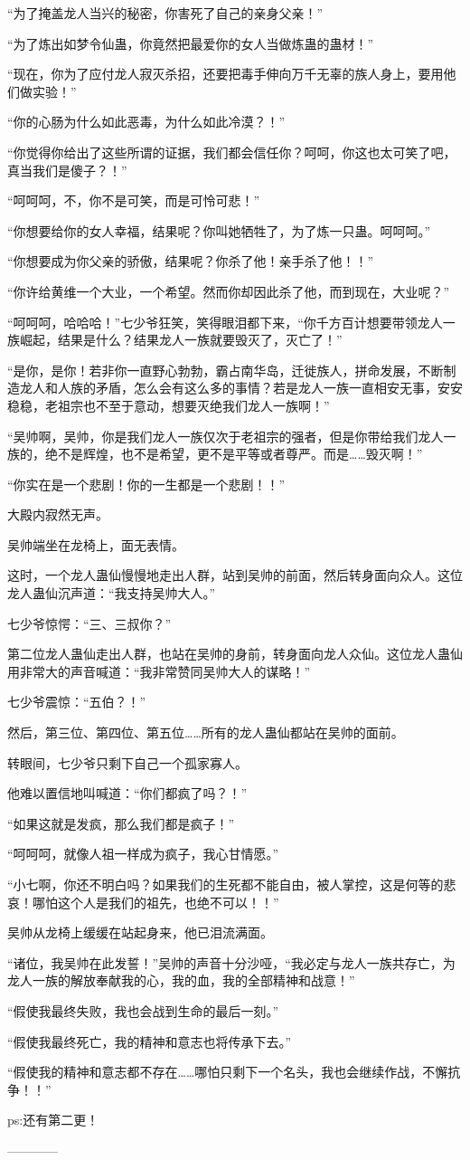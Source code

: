 \begin{this_body}
“为了掩盖龙人当兴的秘密，你害死了自己的亲身父亲！”

“为了炼出如梦令仙蛊，你竟然把最爱你的女人当做炼蛊的蛊材！”

“现在，你为了应付龙人寂灭杀招，还要把毒手伸向万千无辜的族人身上，要用他们做实验！”

“你的心肠为什么如此恶毒，为什么如此冷漠？！”

“你觉得你给出了这些所谓的证据，我们都会信任你？呵呵，你这也太可笑了吧，真当我们是傻子？！”

“呵呵呵，不，你不是可笑，而是可怜可悲！”

“你想要给你的女人幸福，结果呢？你叫她牺牲了，为了炼一只蛊。呵呵呵。”

“你想要成为你父亲的骄傲，结果呢？你杀了他！亲手杀了他！！”

“你许给黄维一个大业，一个希望。然而你却因此杀了他，而到现在，大业呢？”

“呵呵呵，哈哈哈！”七少爷狂笑，笑得眼泪都下来，“你千方百计想要带领龙人一族崛起，结果是什么？结果龙人一族就要毁灭了，灭亡了！”

“是你，是你！若非你一直野心勃勃，霸占南华岛，迁徙族人，拼命发展，不断制造龙人和人族的矛盾，怎么会有这么多的事情？若是龙人一族一直相安无事，安安稳稳，老祖宗也不至于意动，想要灭绝我们龙人一族啊！”

“吴帅啊，吴帅，你是我们龙人一族仅次于老祖宗的强者，但是你带给我们龙人一族的，绝不是辉煌，也不是希望，更不是平等或者尊严。而是……毁灭啊！”

“你实在是一个悲剧！你的一生都是一个悲剧！！”

大殿内寂然无声。

吴帅端坐在龙椅上，面无表情。

这时，一个龙人蛊仙慢慢地走出人群，站到吴帅的前面，然后转身面向众人。这位龙人蛊仙沉声道：“我支持吴帅大人。”

七少爷惊愕：“三、三叔你？”

第二位龙人蛊仙走出人群，也站在吴帅的身前，转身面向龙人众仙。这位龙人蛊仙用非常大的声音喊道：“我非常赞同吴帅大人的谋略！”

七少爷震惊：“五伯？！”

然后，第三位、第四位、第五位……所有的龙人蛊仙都站在吴帅的面前。

转眼间，七少爷只剩下自己一个孤家寡人。

他难以置信地叫喊道：“你们都疯了吗？！”

“如果这就是发疯，那么我们都是疯子！”

“呵呵呵，就像人祖一样成为疯子，我心甘情愿。”

“小七啊，你还不明白吗？如果我们的生死都不能自由，被人掌控，这是何等的悲哀！哪怕这个人是我们的祖先，也绝不可以！！”

吴帅从龙椅上缓缓在站起身来，他已泪流满面。

“诸位，我吴帅在此发誓！”吴帅的声音十分沙哑，“我必定与龙人一族共存亡，为龙人一族的解放奉献我的心，我的血，我的全部精神和战意！”

“假使我最终失败，我也会战到生命的最后一刻。”

“假使我最终死亡，我的精神和意志也将传承下去。”

“假使我的精神和意志都不存在……哪怕只剩下一个名头，我也会继续作战，不懈抗争！！”

ps:还有第二更！

------------

\end{this_body}

